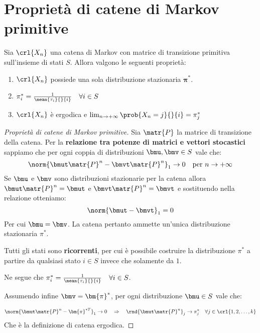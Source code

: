 \documentclass[\main/main.tex]{subfiles}
\begin{document}
\section{Proprietà di catene di Markov primitive}
\begin{theorem}
  Sia \(\crl{X_n}\) una catena di Markov con matrice di transizione primitiva sull'insieme di stati \(S\). Allora valgono le seguenti proprietà:
  \begin{enumerate}
    \item \(\crl{X_n}\) possiede una sola distribuzione stazionaria \(\bm{\pi}^*\).
    \item \(\pi^*_i = \frac{1}{\mean{\tau_i}{}{i}} \quad \forall i \in S\)
    \item \(\crl{X_n}\) è ergodica e \(\lim_{n\rightarrow +\infty} \prob{X_n = j}{}{i} = \pi^*_j\)
  \end{enumerate}
\end{theorem}
\begin{proof}[Proprietà di catene di Markov primitive]
  Sia \(\matr{P}\) la matrice di transizione della catena. Per la \textbf{relazione tra potenze di matrici e vettori stocastici} sappiamo che per ogni coppia di distribuzioni \(\bmu, \bmv \in S\) vale che:
  \[
    \norm{\bmut \matr{P}^n - \bmvt \matr{P}^n}_1 \rightarrow 0 \quad \text{per } n \rightarrow +\infty
  \]
  Se \(\bmu \) e \(\bmv \) sono distribuzioni stazionarie per la catena allora \(\bmut \matr{P}^n = \bmut \) e \(\bmvt \matr{P}^n = \bmvt \) e sostituendo nella relazione otteniamo:
  \[
    \norm{\bmut - \bmvt}_1 = 0
  \]
  Per cui \(\bmu = \bmv\). La catena pertanto ammette un'unica distribuzione stazionaria \(\pi^*\).

  Tutti gli stati sono \textbf{ricorrenti}, per cui è possibile costruire la distribuzione \(\pi^*\) a partire da qualsiasi stato \(i \in S\) invece che solamente da \(1\).

  Ne segue che \(\pi^*_i = \frac{1}{\mean{\tau_i}{}{i}} \quad \forall i \in S\).

  Assumendo infine \(\bmv = \bm{\pi}^*\), per ogni distribuzione \(\bmu \in S\) vale che:

  \[
    \norm{\bmut \matr{P}^n - \bm{\pi}^{*T}}_1 \rightarrow 0 \quad \Rightarrow \quad \rnd{\bmut \matr{P}^n}_j \rightarrow \pi^*_j \quad \forall j \in \crl{1, 2, \ldots, k}
  \]
  Che è la definizione di catena ergodica.
\end{proof}
\end{document}
